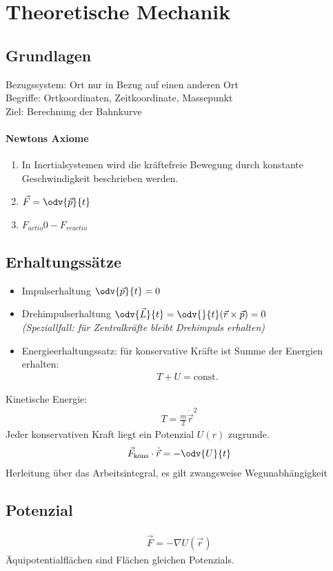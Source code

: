 \section{Theoretische Mechanik}
\subsection{Grundlagen}
Bezugssystem: Ort nur in Bezug auf einen anderen Ort\\
Begriffe: Ortkoordinaten, Zeitkoordinate, Massepunkt\\
Ziel: Berechnung der Bahnkurve
\paragraph{Newtons Axiome}
\begin{enumerate}
	\item In Inertialsystemen wird die kräftefreie Bewegung durch konstante
	      Geschwindigkeit beschrieben werden.
	\item $\vec{F}=\odv{\vec{p}}{t}$
	\item $F_{actio}0-F_{reactio}$
\end{enumerate}

\subsection{Erhaltungssätze}
\begin{itemize}
	\item Impulserhaltung $\odv{\vec{p}}{t}=0$
	\item Drehimpulserhaltung $\odv{\vec{L}}{t}=\odv{}{t} (\vec{r}\times\vec{p})=0$\\
	{\itshape\small (Speziallfall: für Zentralkräfte bleibt Drehimpuls erhalten)}
	\item Energieerhaltungssatz: für konservative Kräfte ist Summe der Energien erhalten: 
	\begin{align*}
		T+U=\text{const.}
	\end{align*}
\end{itemize}
Kinetische Energie:
\begin{align*}
	T=\frac{m}{2}\dot{\vec{r}}^2
\end{align*}
Jeder konservativen Kraft liegt ein Potenzial $U(r)$ zugrunde.
\begin{align*}
	\vec{F}_{\text{kons}}\cdot \dot{\vec{r}}=-\odv{U}{t}
\end{align*}
Herleitung über das Arbeitsintegral, es gilt zwangsweise Wegunabhängigkeit
\subsection{Potenzial}
\begin{align*}
	\vec{F}=-\nabla U(\vec{r})
\end{align*}
Äquipotentialflächen sind Flächen gleichen Potenzials.
